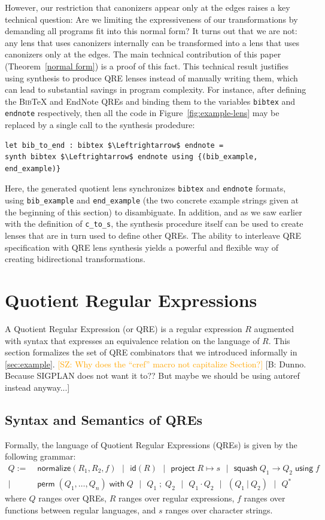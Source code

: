 \documentclass[acmsmall,review,anonymous]{acmart}
\newcommand{\FINISH}[3]{\ifdraft\textcolor{#1}{[#2: #3]}\fi}
\newcommand{\bcp}[1]{\FINISH{dkred}{B}{#1}}
\newcommand{\saz}[1]{\FINISH{orange}{SZ}{#1}}
\newcommand{\codefont}[1]{\ensuremath{\mathsf{#1}}}
\newcommand{\kw}[1]{\codefont{#1}}
\newcommand{\project}[2]{\ensuremath{\kw{project} \; #1 \mapsto #2}}
\newcommand{\squash}[3]{\ensuremath{\kw{squash} \; #1 \rightarrow #2\; \kw{using} \; #3}}
\newcommand{\perm}[2]{\ensuremath{\kw{perm}\; (#1)\; \kw{with}\; #2}}
\newcommand{\normalize}[3]{\ensuremath{\kw{normalize}(#1, #2, #3)}}
\newcommand{\sep}{\ensuremath{\ | \ }}
\newcommand{\bibtex}{\textsc{Bib}\TeX{}}
\newcommand{\semicolon}{\ensuremath{\; ; \;}}
\newcommand{\id}{\ensuremath{\kw{id}}}
\newcommand{\cd}[1]{\lstinline[backgroundcolor=\color{white}]$#1$}
\begin{document}
However, our restriction that canonizers appear only at the edges
raises a key technical question: Are we limiting the expressiveness of
our transformations by demanding all programs fit into this normal
form?  It turns out that we are not: any lens that uses canonizers
internally can be transformed into a lens that uses canonizers only at
the edges. The main technical contribution of this paper
(Theorem~\ref{normal form})
is a proof of this fact.
This technical result justifies 
using synthesis to produce QRE lenses instead of manually writing
them,
which can lead to substantial savings in program complexity.
For instance, after defining the \bibtex{} and EndNote QREs and
binding them to the variables \cd{bibtex} and \cd{endnote} respectively, then
all the code in Figure~\ref{fig:example-lens} may be replaced by a single call
to the synthesis prodedure:
\begin{lstlisting}
let bib_to_end : bibtex $\Leftrightarrow$ endnote =
synth bibtex $\Leftrightarrow$ endnote using {(bib_example, end_example)}
\end{lstlisting}
\noindent 
Here, the generated quotient lens synchronizes \cd{bibtex} and
\cd{endnote} formats, using \cd{bib_example} and \cd{end_example} (the two
concrete example strings given at the beginning of this section) to
disambiguate. In addition, and as we saw earlier with the definition of
\cd{c_to_s}, the synthesis procedure itself can be used to create lenses that
are in turn used to define other QREs.  The ability to interleave QRE
specification with QRE lens synthesis yields a powerful and flexible way of
creating bidirectional transformations.

\section{Quotient Regular Expressions}
\label{QRE}
A Quotient Regular Expression (or QRE) is a regular expression $R$ augmented
with syntax that expresses an equivalence relation on the language of $R$. This
section formalizes the set of QRE combinators that we introduced informally
in \cref{sec:example}.
\iflastminute 
\saz{Why does the ``cref'' macro not capitalize Section?}
\bcp{Dunno.  Because SIGPLAN does not want it to??  But maybe we should be
  using autoref instead anyway...}
\fi

\subsection{Syntax and Semantics of QREs}
Formally, the language of Quotient Regular Expressions (QREs) is given by the
following grammar:
\newcommand{\bsep}{\ \ \sep{} \ \ }
\begin{align*}
Q := \; & \normalize{R_1}{R_2}{f} \bsep{} \id(R) \bsep \project{R}{s} \bsep \squash{Q_1}{Q_2}{f} \\
 | \; & \perm{Q_1, \ldots, Q_n}{Q} \bsep Q_1 \semicolon Q_2 \bsep Q_1 \cdot Q_2 \bsep (Q_1
\sep Q_2) \bsep Q^*
\end{align*}
where $Q$ ranges over QREs, 
$R$ ranges over regular expressions, 
$f$ ranges over functions between regular languages, and 
$s$ ranges over character strings.
\end{document}
